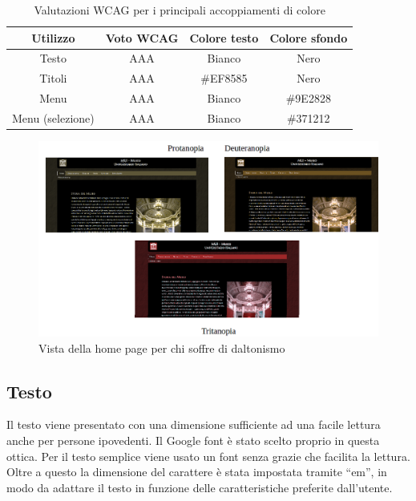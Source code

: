 \documentclass[10pt,a4paper,onecolumn]{article}
\begin{document}
\begin{table}[H]
    \centering
    \begin{tabular}{ | c | c | c | c |}
        \hline
        \textbf{Utilizzo} & \textbf{Voto WCAG} & \textbf{Colore testo}  & \textbf{Colore sfondo}\\
        \hline
        Testo & AAA & Bianco & Nero \\
        \hline
        Titoli & AAA & \#EF8585 & Nero \\
        \hline
        Menu & AAA & Bianco & \#9E2828 \\
        \hline
        Menu (selezione) & AAA & Bianco & \#371212 \\
        \hline
    \end{tabular}
    \caption{Valutazioni WCAG per i principali accoppiamenti di colore}
\end{table}

\begin{figure}[h]
\centering
\includegraphics[scale=0.30]{daltonismo.png}
\caption{Vista della home page per chi soffre di daltonismo}
\end{figure}

\subsection{Testo}
Il testo viene presentato con una dimensione sufficiente ad una facile lettura anche per persone ipovedenti. Il Google font è stato scelto proprio in questa ottica. Per il testo semplice viene usato un font senza grazie che facilita la lettura. Oltre a questo la dimensione del carattere è stata impostata tramite “em”, in modo da adattare il testo in funzione delle caratteristiche preferite dall’utente.
\end{document}
